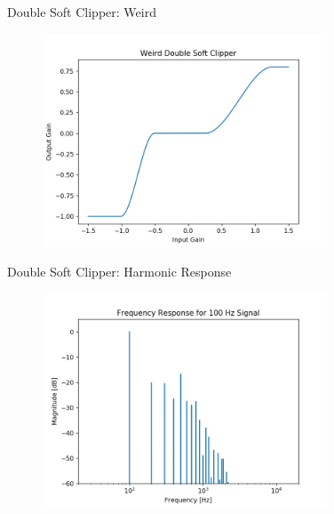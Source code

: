 \begin{frame}{Double Soft Clipper: Weird}
    \begin{figure}
        \centering
        \includegraphics[height=2.5in]{../DoubleSoftClipper/Pics/Weird.png}
    \end{figure}
\end{frame}

\begin{frame}{Double Soft Clipper: Harmonic Response}
    \begin{figure}
        \centering
        \includegraphics[height=2.5in]{../DoubleSoftClipper/Pics/Freq.png}
    \end{figure}
\end{frame}
